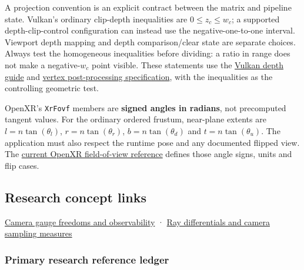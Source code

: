 A projection convention is an explicit contract between the matrix and pipeline state. Vulkan's ordinary clip-depth inequalities are \(0\le z_c\le w_c\); a supported depth-clip-control configuration can instead use the negative-one-to-one interval. Viewport depth mapping and depth comparison/clear state are separate choices. Always test the homogeneous inequalities before dividing: a ratio in range does not make a negative-\(w_c\) point visible. These statements use the \href{https://docs.vulkan.org/guide/latest/depth.html}{Vulkan depth guide} and \href{https://docs.vulkan.org/spec/latest/chapters/vertexpostproc.html}{vertex post-processing specification}, with the inequalities as the controlling geometric test.

OpenXR's \texttt{XrFovf} members are \textbf{signed angles in radians}, not precomputed tangent values. For the ordinary ordered frustum, near-plane extents are \(l=n\tan(\theta_l)\), \(r=n\tan(\theta_r)\), \(b=n\tan(\theta_d)\) and \(t=n\tan(\theta_u)\). The application must also respect the runtime pose and any documented flipped view. The \href{https://registry.khronos.org/OpenXR/specs/1.1/man/html/XrFovf.html}{current OpenXR field-of-view reference} defines those angle signs, units and flip cases.

\subsection{Research concept links}\label{02-foundations-ii-ch039-research-concept-links}

\hyperref[02-foundations-ii-ch037-a-camera-model-must-close-the-loop]{Camera gauge freedoms and observability} · \hyperref[02-foundations-ii-ch037-a-camera-model-must-close-the-loop]{Ray differentials and camera sampling measures}

\subsubsection{Primary research reference ledger}\label{02-foundations-ii-ch039-primary-research-reference-ledger}

